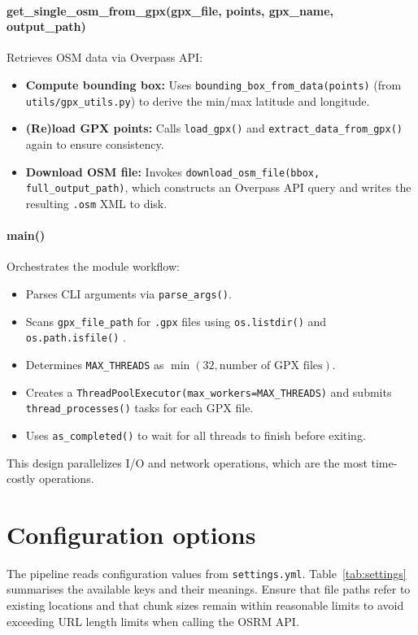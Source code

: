 \documentclass[11pt,a4paper]{article}
\begin{document}
\paragraph{get\_single\_osm\_from\_gpx(gpx\_file, points, gpx\_name, output\_path)}
Retrieves OSM data via Overpass API:
\begin{itemize}
	\item \textbf{Compute bounding box:} Uses \texttt{bounding\_box\_from\_data(points)} (from \texttt{utils/gpx\_utils.py}) to derive the min/max latitude and longitude.
	\item \textbf{(Re)load GPX points:} Calls \texttt{load\_gpx()} and \texttt{extract\_data\_from\_gpx()} again to ensure consistency.
	\item \textbf{Download OSM file:} Invokes \texttt{download\_osm\_file(bbox, full\_output\_path)}, which constructs an Overpass API query and writes the resulting \texttt{.osm} XML to disk.
\end{itemize}

\paragraph{main()}
Orchestrates the module workflow:
\begin{itemize}
	\item Parses CLI arguments via \texttt{parse\_args()}.
	\item Scans \texttt{gpx\_file\_path} for \texttt{.gpx} files using \texttt{os.listdir()} and \texttt{os.path.isfile()} \citep{python-os-doc}.
	\item Determines \texttt{MAX\_THREADS} as \(\min(32, \text{number of GPX files})\).
	\item Creates a \texttt{ThreadPoolExecutor(max\_workers=MAX\_THREADS)} and submits \texttt{thread\_processes()} tasks for each GPX file.
	\item Uses \texttt{as\_completed()} to wait for all threads to finish before exiting.
\end{itemize}

\vspace{1ex}\noindent
This design parallelizes I/O and network operations, which are the most time-costly operations.

\section{Configuration options}
The pipeline reads configuration values from \texttt{settings.yml}.  Table~\ref{tab:settings} summarises the available keys and their meanings.  Ensure that file paths refer to existing locations and that chunk sizes remain within reasonable limits to avoid exceeding URL length limits when calling the OSRM API.
\end{document}

